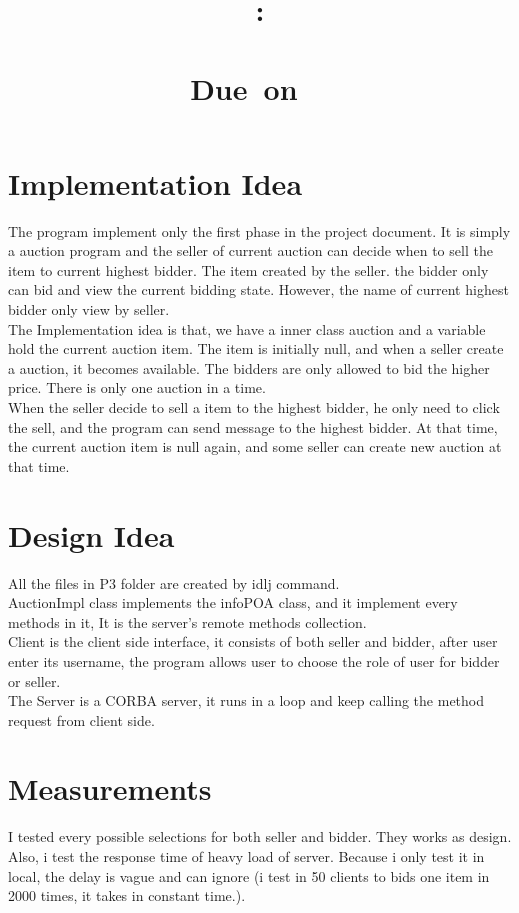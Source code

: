 \documentclass{article}
\title{
    \vspace{2in}
    \textmd{\textbf{\hmwkClass:\\\ \hmwkTitle}}\\
    \normalsize\vspace{0.1in}\small{Due\ on\ \hmwkDueDate\ }\\
    \vspace{0.1in}\large{\textit{\hmwkClassInstructor}}
    \vspace{3in}
}
\author{\textbf{\hmwkAuthorName}}
\date{}
\begin{document}
\maketitle
\newpage
\tableofcontents
\newpage
\section{Implementation Idea}
The program implement only the first phase in the project document. It is simply a auction program and the seller of current auction can decide when to sell the item to current highest bidder. The item created by the seller. the bidder only can bid and view the current bidding state. However, the name of current highest bidder only view by seller.\\

The Implementation idea is that, we have a inner class auction and a variable hold the current auction item. The item is initially null, and when a seller create a auction, it becomes available. The bidders are only allowed to bid the higher price. There is only one auction in a time. \\

When the seller decide to sell a item to the highest bidder, he only need to click the sell, and the program can send message to the highest bidder. At that time, the current auction item is null again, and some seller can create new auction at that time.
\clearpage 
\section{Design Idea}
All the files in P3 folder are created by idlj command.\\

AuctionImpl class implements the infoPOA class, and it implement every methods in it, It is the server's remote methods collection. \\

Client is the client side interface, it consists of both seller and bidder, after user enter its username, the program allows user to choose the role of user for bidder or seller. \\

The Server is a CORBA server, it runs in a loop and keep calling the method request from client side.
\section{Measurements}
I tested every possible selections for both seller and bidder. They works as design. Also, i test the response time of heavy load of server. Because i only test it in local, the delay is vague and can ignore (i test in 50 clients to bids one item in 2000 times, it takes in constant time.).
\label{my-label}
\end{document}
